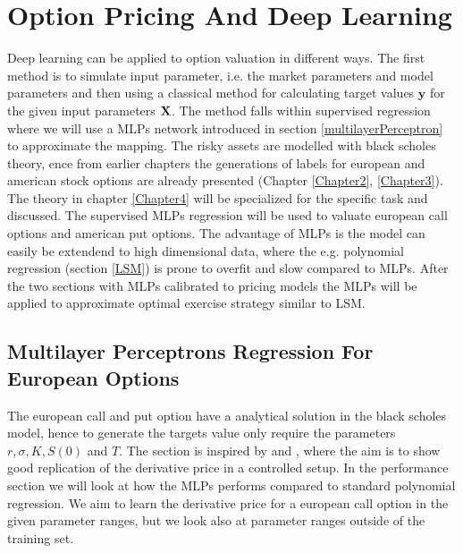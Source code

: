 
\chapter{Option Pricing And Deep Learning} %

\label{Chapter5} %

Deep learning can be applied to option valuation in different ways. The first method is to simulate input parameter, i.e. the market parameters and model parameters and then using a classical method for calculating target values $\bm{y}$ for the given input parameters $\mathbf{X}$. The method falls within supervised regression where we will use a MLPs network introduced in section \ref{multilayerPerceptron} to approximate the mapping. The risky assets are modelled with black scholes theory, ence from earlier chapters the generations of labels for european and american stock options are already presented (Chapter \ref{Chapter2}, \ref{Chapter3}). The theory in chapter \ref{Chapter4} will be specialized for the specific task and discussed. The supervised MLPs regression will be used to valuate european call options and american put options. The advantage of MLPs is the model can easily be extendend to high dimensional data, where the e.g. polynomial regression (section \ref{LSM}) is prone to overfit and slow compared to MLPs. After the two sections with MLPs calibrated to pricing models the MLPs will be applied to approximate optimal exercise strategy similar to LSM.


\section{Multilayer Perceptrons Regression For European Options}
The european call and put option have a analytical solution in the black scholes model, hence to generate the targets value only require the parameters $r, \sigma, K, S(0)$ and $T$. The section is inspired by \parencite{HirsaAli2019} and \parencite{GasparRaquel20}, where the aim is to show good replication of the derivative price in a controlled setup. In the performance section we will look at how the MLPs performs compared to standard polynomial regression. We aim to learn the derivative price for a european call option in the given parameter ranges, but we look also at parameter ranges outside of the training set.

